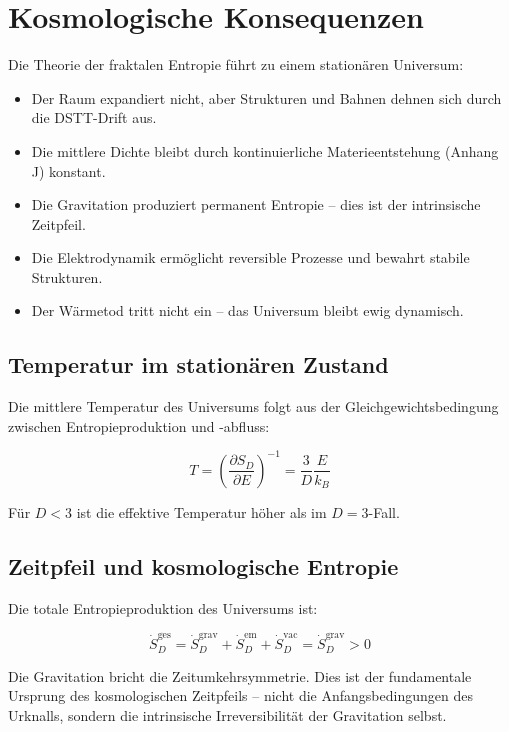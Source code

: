 \section{Kosmologische Konsequenzen}

Die Theorie der fraktalen Entropie führt zu einem stationären Universum:

\begin{itemize}
    \item Der Raum expandiert nicht, aber Strukturen und Bahnen dehnen sich durch die 
          DSTT-Drift aus.
    \item Die mittlere Dichte bleibt durch kontinuierliche Materieentstehung (Anhang J) konstant.
    \item Die Gravitation produziert permanent Entropie – dies ist der intrinsische Zeitpfeil.
    \item Die Elektrodynamik ermöglicht reversible Prozesse und bewahrt stabile Strukturen.
    \item Der Wärmetod tritt nicht ein – das Universum bleibt ewig dynamisch.
\end{itemize}

\subsection{Temperatur im stationären Zustand}

Die mittlere Temperatur des Universums folgt aus der Gleichgewichtsbedingung zwischen 
Entropieproduktion und -abfluss:

\[
T = \left( \frac{\partial S_D}{\partial E} \right)^{-1} = \frac{3}{D} \frac{E}{k_B} \tag{M.19}
\]

Für $D < 3$ ist die effektive Temperatur höher als im $D = 3$-Fall.

\subsection{Zeitpfeil und kosmologische Entropie}

Die totale Entropieproduktion des Universums ist:

\[
\dot{S}_D^{\text{ges}} = \dot{S}_D^{\text{grav}} + \dot{S}_D^{\text{em}} + \dot{S}_D^{\text{vac}} = \dot{S}_D^{\text{grav}} > 0 \tag{M.20}
\]

Die Gravitation bricht die Zeitumkehrsymmetrie. Dies ist der fundamentale Ursprung 
des kosmologischen Zeitpfeils – nicht die Anfangsbedingungen des Urknalls, sondern 
die intrinsische Irreversibilität der Gravitation selbst.

